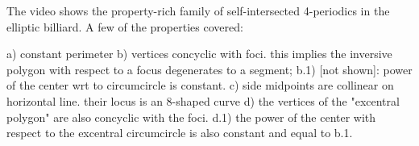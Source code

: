 The video shows the property-rich family of self-intersected 4-periodics in the elliptic billiard. A few of the properties covered:

a) constant perimeter
b) vertices concyclic with foci. this implies the inversive polygon with respect to a focus degenerates to a segment;
b.1) [not shown]: power of the center wrt to circumcircle is constant.
c) side midpoints are collinear on horizontal line. their locus is an 8-shaped curve
d) the vertices of the "excentral polygon" are also concyclic with the foci.
d.1) the power of the center with respect to the excentral circumcircle is also constant and equal to b.1.